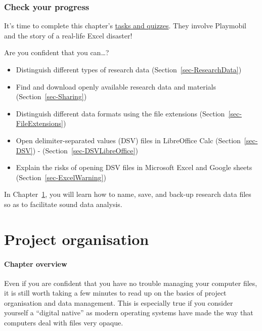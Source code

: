 \documentclass[
  letterpaper,
  DIV=11,
  numbers=noendperiod]{scrreprt}
\providecommand{\tightlist}{%
  \setlength{\itemsep}{0pt}\setlength{\parskip}{0pt}}
\begin{document}
\subsection*{Check your progress}\label{check-your-progress-3}

It's time to complete this chapter's
\href{https://elenlefoll.github.io/RstatsTextbook/quizzes/2_quiz.html}{tasks
and quizzes}. They involve Playmobil and the story of a real-life Excel
disaster!

Are you confident that you can\ldots?

\begin{itemize}
\tightlist
\item[$\square$]
  Distinguish different types of research data
  (Section~\ref{sec-ResearchData})
\item[$\square$]
  Find and download openly available research data and materials
  (Section~\ref{sec-Sharing})
\item[$\square$]
  Distinguish different data formats using the file extensions
  (Section~\ref{sec-FileExtensions})
\item[$\square$]
  Open delimiter-separated values (DSV) files in LibreOffice Calc
  (Section~\ref{sec-DSV}) - (Section~\ref{sec-DSVLibreOffice})
\item[$\square$]
  Explain the risks of opening DSV files in Microsoft Excel and Google
  sheets (Section~\ref{sec-ExcelWarning})
\end{itemize}

In Chapter~\ref{sec-DataManagement}, you will learn how to name, save,
and back-up research data files so as to facilitate sound data analysis.


\chapter{Project organisation}\label{sec-DataManagement}

\subsubsection*{\texorpdfstring{\textbf{Chapter
overview}}{Chapter overview}}\label{chapter-overview-2}

Even if you are confident that you have no trouble managing your
computer files, it is still worth taking a few minutes to read up on the
basics of project organisation and data management. This is especially
true if you consider yourself a ``digital native'' as modern operating
systems have made the way that computers deal with files very opaque.
\end{document}
